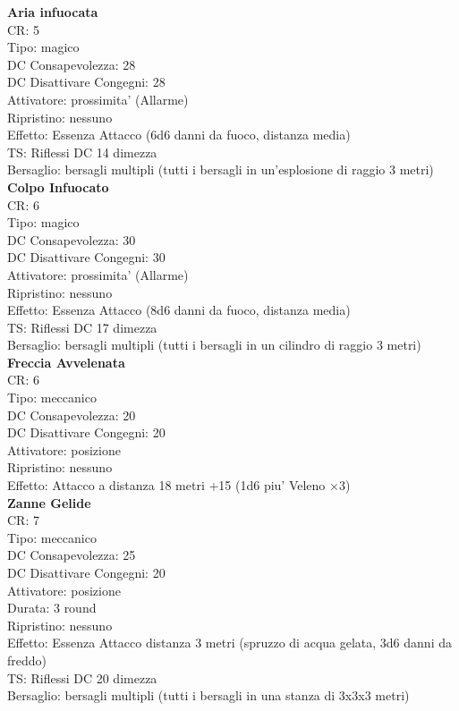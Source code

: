 \documentclass[a4paper,11pt,twoside,openany]{book}
\begin{document}
\begin{multicols}{2}
\textbf{Aria infuocata}\\
CR: 5 \\
Tipo: magico \\
DC Consapevolezza: 28 \\
DC Disattivare Congegni: 28 \\
Attivatore: prossimita' (Allarme) \\
Ripristino: nessuno \\
Effetto: Essenza Attacco (6d6 danni da fuoco, distanza media)\\
TS: Riflessi DC 14 dimezza \\
Bersaglio: bersagli multipli (tutti i bersagli in un’esplosione di raggio 3 metri)\\

\textbf{Colpo Infuocato}\\
CR: 6 \\
Tipo: magico \\
DC Consapevolezza: 30 \\
DC Disattivare Congegni: 30 \\
Attivatore: prossimita' (Allarme) \\
Ripristino: nessuno \\
Effetto: Essenza Attacco (8d6 danni da fuoco, distanza media)\\
TS: Riflessi DC 17 dimezza \\
Bersaglio: bersagli multipli (tutti i bersagli in un cilindro di raggio 3 metri)\\

\textbf{Freccia Avvelenata}\\
CR: 6 \\
Tipo: meccanico \\
DC Consapevolezza: 20 \\
DC Disattivare Congegni: 20 \\
Attivatore: posizione \\
Ripristino: nessuno \\
Effetto: Attacco a distanza 18 metri +15 (1d6 piu' Veleno ×3)\\

\textbf{Zanne Gelide}\\
CR: 7 \\
Tipo: meccanico \\
DC Consapevolezza: 25 \\
DC Disattivare Congegni: 20 \\
Attivatore: posizione \\
Durata: 3 round \\
Ripristino: nessuno \\
Effetto: Essenza Attacco distanza 3 metri (spruzzo di acqua gelata, 3d6 danni da freddo) \\
TS: Riflessi DC 20 dimezza \\
Bersaglio: bersagli multipli (tutti i bersagli in una stanza di 3x3x3 metri)\\


\end{multicols}
\end{document}
